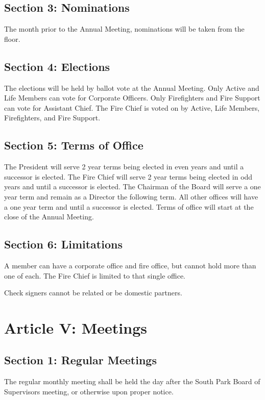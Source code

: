 ﻿\documentclass[12pt,letterpaper]{article}
\begin{document}
\subsection*{Section 3: Nominations}
The month prior to the Annual Meeting, nominations will be taken from the floor.

\subsection*{Section 4: Elections}
The elections will be held by ballot vote at the Annual Meeting.  Only Active and Life Members can vote for Corporate Officers.  Only Firefighters and Fire Support can vote for Assistant Chief.  The Fire Chief is voted on by Active, Life Members, Firefighters, and Fire Support.

\subsection*{Section 5: Terms of Office}
The President will serve 2 year terms being elected in even years and until a successor is elected.  The Fire Chief will serve 2 year terms being elected in odd years and until a successor is elected.  The Chairman of the Board will serve a one year term and remain as a Director the following term.   All other offices will have a one year term and until a successor is elected.  Terms of office will start at the close of the Annual Meeting.

\subsection*{Section 6: Limitations}
A member can have a corporate office and fire office, but cannot hold more than one of each.  The Fire Chief is limited to that single office.  

Check signers cannot be related or be domestic partners.

\section*{Article V: Meetings}

\subsection*{Section 1: Regular Meetings}
The regular monthly meeting shall be held the day after the South Park Board of Supervisors meeting, or otherwise upon proper notice. 
\end{document}

